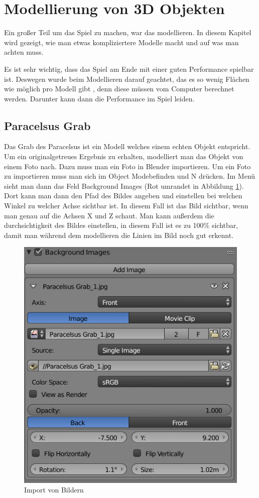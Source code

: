 \section{Modellierung von 3D Objekten}
Ein großer Teil um das Spiel zu machen, war das modellieren. In diesem Kapitel wird gezeigt, wie man etwas kompliziertere
Modelle macht und auf was man achten muss.

Es ist sehr wichtig, dass das Spiel am Ende mit einer guten Performance spielbar ist. Deswegen wurde beim Modellieren darauf geachtet,
das es so wenig Flächen wie möglich pro Modell gibt \citep{unreal:modellierungVon3dObjekten_performance}, denn diese müssen vom Computer berechnet werden.
Darunter kann dann die Performance im Spiel leiden.

\label{sec:Modellierung_von_3D_Objekten}
\subsection{Paracelsus Grab}
Das Grab des Paracelsus ist ein Modell welches einem echten Objekt entspricht. Um ein originalgetreues Ergebnis zu erhalten,
modelliert man das Objekt von einem Foto nach. Dazu muss man ein Foto in Blender importieren. Um ein Foto zu importieren muss man sich im \dq Object Mode\dq befinden und \dq N\dq
drücken. Im Menü sieht man dann das Feld Background Images (Rot umrandet in Abbildung \ref{Paracelsus_Grab:image1}). Dort kann man dann den Pfad des Bildes angeben
und einstellen bei welchen Winkel zu welcher Achse sichtbar ist. In diesem Fall ist das Bild sichtbar, wenn man genau auf die Achsen X und Z schaut. Man kann außerdem die
durchsichtigkeit des Bildes einstellen, in diesem Fall ist es zu 100\% sichtbar, damit man während dem modellieren die Linien im Bild noch gut erkennt.

\begin{figure}[h]
    \centering
    \includegraphics[width=.8\textwidth]{images/Paracelsus-Grab_Import-von-Bildern.png}
    \caption{Import von Bildern}
    \label{Paracelsus_Grab:image1}
\end{figure}


